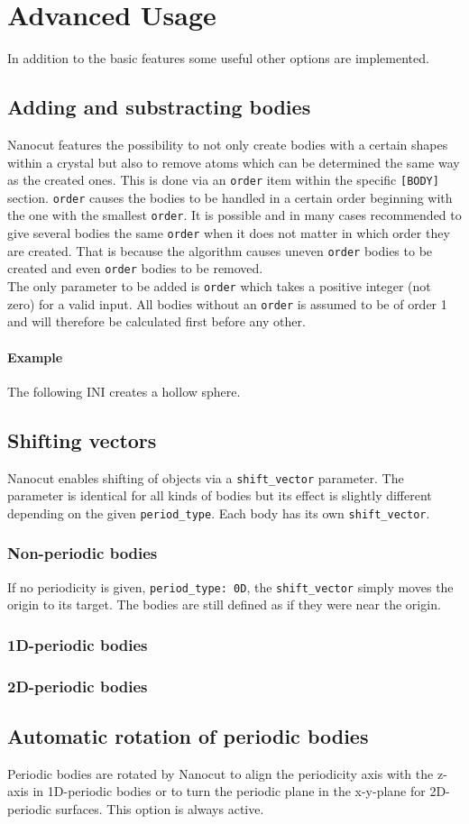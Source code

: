 \section{Advanced Usage}
In addition to the basic features some useful other options are implemented. 
\subsection{Adding and substracting bodies}
Nanocut features the possibility to not only create bodies with a certain shapes within a crystal but also to remove atoms which can be determined the same way as the created ones. This is done via an \lstinline{order} item within the specific \lstinline{[BODY]} section. \lstinline{order} causes the bodies to be handled in a certain order beginning with the one with the smallest \lstinline{order}. It is possible and in many cases recommended to give several bodies the same \lstinline{order} when it does not matter in which order they are created. That is because the algorithm causes uneven \lstinline{order} bodies to be created and even \lstinline{order} bodies to be removed.\\
The only parameter to be added is \lstinline{order} which takes a positive integer (not zero) for a valid input. All bodies without an \lstinline{order} is assumed to be of order 1 and will therefore be calculated first before any other.
\paragraph{Example}
The following INI creates a hollow sphere.

\subsection{Shifting vectors}
Nanocut enables shifting of objects via a \lstinline{shift_vector} parameter. The parameter is identical for all kinds of bodies but its effect is slightly different depending on the given \lstinline{period_type}. Each body has its own \lstinline{shift_vector}.
\subsubsection{Non-periodic bodies}
If no periodicity is given, \lstinline{period_type: 0D}, the \lstinline{shift_vector} simply moves the origin to its target. The bodies are still defined as if they were near the origin.
\subsubsection{1D-periodic bodies}
\subsubsection{2D-periodic bodies}
\subsection{Automatic rotation of periodic bodies}
Periodic bodies are rotated by Nanocut to align the periodicity axis with the z-axis in 1D-periodic bodies or to turn the periodic plane in the x-y-plane for 2D-periodic surfaces. This option is always active.